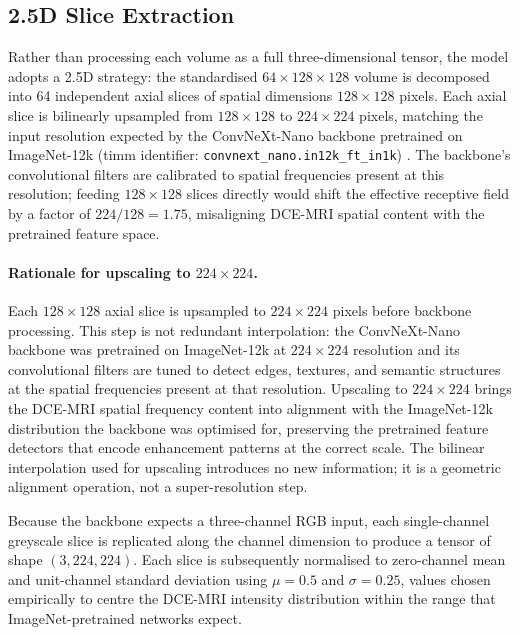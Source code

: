 \subsection{2.5D Slice Extraction}
\label{sec:slice-extraction}

Rather than processing each volume as a full
three-dimensional tensor, the model adopts a 2.5D strategy:
the standardised $64 \times 128 \times 128$ volume is
decomposed into 64 independent axial slices of spatial
dimensions $128 \times 128$ pixels.
Each axial slice is bilinearly upsampled from
$128 \times 128$ to $224 \times 224$ pixels, matching
the input resolution expected by the ConvNeXt-Nano
backbone pretrained on ImageNet-12k
(timm identifier: \texttt{convnext\_nano.in12k\_ft\_in1k})
\cite{liu2022convnet}.
The backbone's convolutional filters are calibrated to
spatial frequencies present at this resolution;
feeding $128 \times 128$ slices directly would shift
the effective receptive field by a factor of
$224/128 = 1.75$, misaligning DCE-MRI spatial content
with the pretrained feature space.

\paragraph{Rationale for upscaling to $224 \times 224$.}
Each $128 \times 128$ axial slice is upsampled to
$224 \times 224$ pixels before backbone processing.
This step is not redundant interpolation: the
ConvNeXt-Nano backbone was pretrained on ImageNet-12k at
$224 \times 224$ resolution and its convolutional
filters are tuned to detect edges, textures, and
semantic structures at the spatial frequencies
present at that resolution.
Upscaling to $224 \times 224$ brings the DCE-MRI
spatial frequency content into alignment with the
ImageNet-12k distribution the backbone was optimised
for, preserving the pretrained feature detectors
that encode enhancement patterns at the correct
scale.
The bilinear interpolation used for upscaling
introduces no new information; it is a geometric
alignment operation, not a super-resolution step.

Because the backbone expects a three-channel RGB input,
each single-channel greyscale slice is replicated along the
channel dimension to produce a tensor of shape
$(3, 224, 224)$.
Each slice is subsequently normalised to zero-channel mean
and unit-channel standard deviation using $\mu = 0.5$ and
$\sigma = 0.25$, values chosen empirically to centre the
DCE-MRI intensity distribution within the range that
ImageNet-pretrained networks expect.

